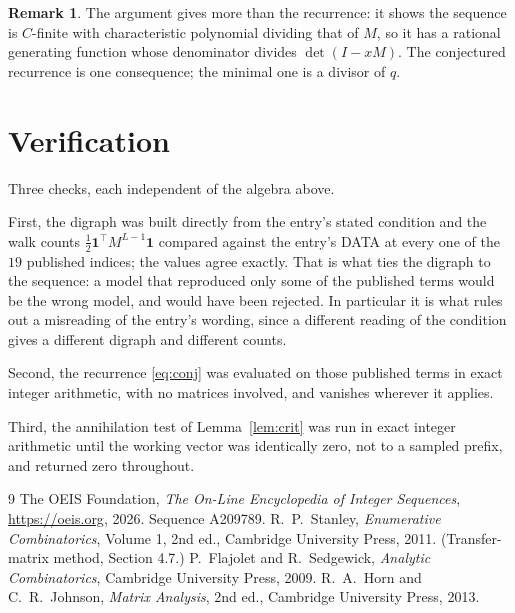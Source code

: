 \documentclass[11pt,a4paper]{article}
\theoremstyle{plain}
\theoremstyle{definition}
\newtheorem{remark}[theorem]{Remark}
\begin{document}
\begin{remark}
The argument gives more than the recurrence: it shows the sequence is $C$-finite with
characteristic polynomial dividing that of $M$, so it has a rational generating function
whose denominator divides $\det(I-xM)$. The conjectured recurrence is one consequence; the
minimal one is a divisor of $q$.
\end{remark}

\section{Verification}

Three checks, each independent of the algebra above.

First, the digraph was built directly from the entry's stated condition and the walk counts
$\tfrac1{2}\mathbf{1}^{\!\top}M^{L-1}\mathbf{1}$ compared against the entry's DATA at
every one of the $19$ published indices; the values agree exactly. That is what ties
the digraph to the sequence: a model that reproduced only some of the published terms would
be the wrong model, and would have been rejected. In particular it is what rules out a
misreading of the entry's wording, since a different reading of the condition gives a
different digraph and different counts.

Second, the recurrence \eqref{eq:conj} was evaluated on those published terms in exact
integer arithmetic, with no matrices involved, and vanishes wherever it applies.

Third, the annihilation test of Lemma~\ref{lem:crit} was run in exact integer arithmetic
until the working vector was identically zero, not to a sampled prefix, and returned zero
throughout.

\begin{thebibliography}{9}
 The OEIS Foundation, \emph{The On-Line Encyclopedia of Integer
Sequences}, \url{https://oeis.org}, 2026. Sequence A209789.
 R.~P.~Stanley, \emph{Enumerative Combinatorics}, Volume 1, 2nd ed.,
Cambridge University Press, 2011. (Transfer-matrix method, Section 4.7.)
 P.~Flajolet and R.~Sedgewick, \emph{Analytic Combinatorics}, Cambridge
University Press, 2009.
 R.~A.~Horn and C.~R.~Johnson, \emph{Matrix Analysis}, 2nd ed., Cambridge
University Press, 2013.
\end{thebibliography}
\end{document}
